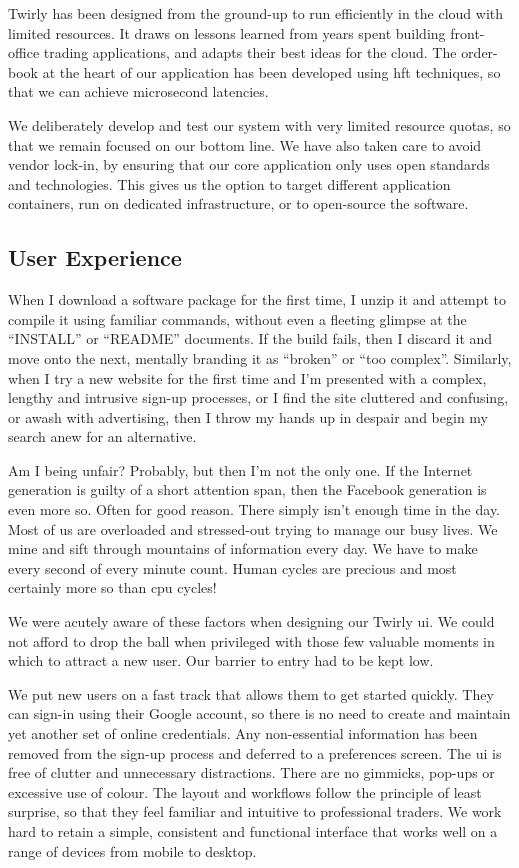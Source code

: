 \documentclass[11pt,a4paper]{article}
\newcommand{\twirly}{Twirly\cite{twirly}}
\begin{document}
\twirly{} has been designed from the ground-up to run efficiently in the \gls{cloud} with limited
resources.  It draws on lessons learned from years spent building front-office trading applications,
and adapts their best ideas for the \gls{cloud}. The \gls{order-book} at the heart of our
application has been developed using \gls{hft} techniques, so that we can achieve microsecond
latencies.

We deliberately develop and test our system with very limited resource quotas, so that we remain
focused on our bottom line. We have also taken care to avoid vendor lock-in, by ensuring that our
core application only uses open standards and technologies. This gives us the option to target
different application containers, run on dedicated infrastructure, or to open-source the software.

\subsection{User Experience}

When I download a software package for the first time, I \gls{unzip} it and attempt to compile it
using familiar commands, without even a fleeting glimpse at the ``INSTALL'' or ``README''
documents. If the build fails, then I discard it and move onto the next, mentally branding it as
``broken'' or ``too complex''. Similarly, when I try a new website for the first time and I'm
presented with a complex, lengthy and intrusive sign-up processes, or I find the site cluttered and
confusing, or awash with advertising, then I throw my hands up in despair and begin my search anew
for an alternative.

Am I being unfair? Probably, but then I'm not the only one. If the Internet generation is guilty of
a short attention span, then the Facebook\cite{facebook} generation is even more so. Often for good
reason. There simply isn't enough time in the day. Most of us are overloaded and stressed-out trying
to manage our busy lives. We mine and sift through mountains of information every day. We have to
make every second of every minute count. Human cycles are precious and most certainly more so than
\gls{cpu} cycles!

We were acutely aware of these factors when designing our \twirly{} \gls{ui}. We could not afford to
drop the ball when privileged with those few valuable moments in which to attract a new user. Our
barrier to entry had to be kept low.

We put new users on a fast track that allows them to get started quickly. They can sign-in using
their Google\cite{google} account, so there is no need to create and maintain yet another set of
online credentials. Any non-essential information has been removed from the sign-up process and
deferred to a preferences screen. The \gls{ui} is free of clutter and unnecessary
distractions. There are no gimmicks, pop-ups or excessive use of colour. The layout and workflows
follow the principle of least surprise, so that they feel familiar and intuitive to professional
traders. We work hard to retain a simple, consistent and functional interface that works well on a
range of devices from mobile to desktop.
\end{document}
